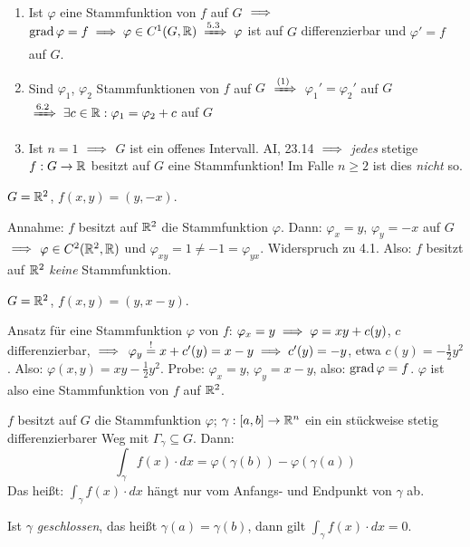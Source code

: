 \documentclass[a4paper,oneside,DIV15,BCOR12mm,chapterprefix=true,headings=onelinechapter]{scrbook}
\begin{document}
\begin{bemerkung}
\ 
\vspace{-1.5em}
\begin{enumerate}
\item Ist $\varphi$ eine Stammfunktion von $f$ auf $G$ $\implies$ $\grad\varphi = f \folgt \varphi \in C^1(G,\MdR) \folgtnach{5.3} \varphi$ ist auf $G$ differenzierbar und $\varphi' = f$ auf $G$.
\item Sind $\varphi_1$, $\varphi_2$ Stammfunktionen von $f$ auf $G$ $\folgtnach{(1)}$ $\varphi_1'=\varphi_2'$ auf $G$ $\folgtnach{6.2} \exists c\in\MdR: \varphi_1=\varphi_2+c$ auf $G$
\item Ist $n=1$ $\implies$ $G$ ist ein offenes Intervall. AI, 23.14 $\implies$ \emph{jedes} stetige $f:G\to\mathbb{R}$ besitzt auf $G$ eine Stammfunktion! Im Falle $n\ge 2$ ist dies \emph{nicht} so.
\end{enumerate}
\end{bemerkung}

\begin{beispiele}
\item $G=\mathbb{R}^2$, $f(x,y) = (y,-x)$.

Annahme: $f$ besitzt auf $\mathbb{R}^2$ die Stammfunktion $\varphi$. Dann: $\varphi_x = y$, $\varphi_y = -x$ auf $G$ $\implies$ $\varphi\in C^2(\mathbb{R}^2,\mathbb{R})$ und $\varphi_{xy} = 1 \ne -1 = \varphi_{yx}$. Widerspruch zu 4.1. Also: $f$ besitzt auf $\mathbb{R}^2$ \emph{keine} Stammfunktion.
\item $G=\mathbb{R}^2$, $f(x,y) = (y,x-y)$.

Ansatz für eine Stammfunktion $\varphi$ von $f$: $\varphi_x=y \implies \varphi=xy+c(y)$, $c$ differenzierbar, $\implies$ $\varphi_y\stackrel{!}{=}x+c'(y) = x-y \implies c'(y) = -y$, etwa $c(y)=-\frac{1}{2}y^2$. Also: $\varphi(x,y) = xy - \frac{1}{2}y^2$. Probe: $\varphi_x=y$, $\varphi_y=x-y$, also: $\mathop{\rm grad}\nolimits\varphi=f$. $\varphi$ ist also eine Stammfunktion von $f$ auf $\mathbb{R}^2$.
\end{beispiele}
\vspace{2em} %
\begin{satz}
$f$ besitzt auf $G$ die Stammfunktion $\varphi$; $\gamma:[a,b]\to\mathbb{R}^n$ ein ein stückweise stetig differenzierbarer Weg mit $\Gamma_\gamma\subseteq G$. Dann:
$$ \int_\gamma f(x)\cdot dx = \varphi\left(\gamma(b)\right) - \varphi\left(\gamma(a)\right) $$
Das heißt: $\int_\gamma f(x)\cdot dx$ hängt nur vom Anfangs- und Endpunkt von $\gamma$ ab.

Ist $\gamma$ \emph{geschlossen}, das heißt $\gamma(a) = \gamma(b)$, dann gilt $\int_\gamma f(x)\cdot dx = 0$.
\end{satz}
\end{document}
